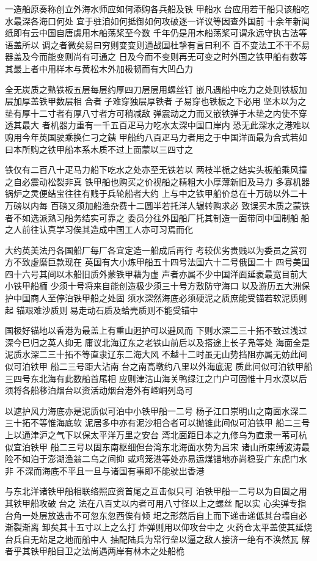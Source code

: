 \documentclass[a4paper,12pt,UTF8,twoside]{ctexbook}
\begin{document}
一造船原奏称创立外海水师应如何添购各兵船及铁
甲船水𪿫台应用若干船只该船吃水最深各海口何处
宜于驻洎如何抵御如何攻破逐一详议等因查外国前
十余年新闻纸即有云中国自唐虞用木船荡桨至今数
千年仍是用木船荡桨可谓永远守执古法等语盖所以
调之者微矣易曰穷则变变则通战国杜挚有言曰利不
百不变法工不干不易器盖及今而能变则尚有可通之
日及今而不变则再无可变之时外国之铁甲船有数等
其最上者中用样木与黄松木外加极韧而有大凹凸力

全无炭质之熟铁板五层每层约厚四刀层层用螺丝钉
嵌凡遇船中吃力之处则铁板加层加厚盖铁甲数层相
合者𪿫子难穿独层厚铁者𪿫子易穿也铁板之下必用
坚木以为之垫有厚十二寸者有厚八寸者方可稍减敌
弹震动之力而又嵌铁弹于木垫之内使不穿透其最大
者机器力重有一千五百疋马力吃水太深中国口岸内
恐无此深水之港难以购用今年英国驶乘换仁刁之銕
甲船约八百疋马力者用之于中国洋面最为合式若如
曰本所购之铁甲船本系木质不过上面蒙以三四寸之

铁仅有二百八十疋马力船下吃水之处亦至无铁若以
两枝半栀之结实头板船乘风撞之自必震动松裂非真
铁甲船也购买之价视船之精粗大小厚薄新旧及马力
多寡机器锅炉之灵便结宝往往有贱于兵轮船者大约
上与中之铁甲船价总在十万磅以外二十万磅以内每
百磅又须加船渔杂费十二圆半若托洋人辗转购求必
致误买木质之蒙铁者不如选派熟习船务结实可靠之
委员分往外国船厂托其制造一面带同中国制船𮩽船
之人前往认真学习俟其造成中国工人亦可习焉而化

大约英美法丹各国船厂每厂各宜定造一船成后再行
考较优劣贵贱以为委员之赏罚方不致虚縻巨款现在
英国有大小炼甲船五十四号法国六十二号俄国二十
四号美国四十六号其间以木船旧质外蒙铁甲藉为虚
声者亦属不少中国洋面延袤最宽目前大小铁甲船栭
少须十号将来自能创造极少须三十号方敷防守海口
以及游历五大洲保护中国商人至停泊铁甲船之处固
须水深然海底必须硬泥之质庶能受锚若软泥质则起
锚艰难沙质则𬮁易走动石质及蛤壳质则不能受锚中

国极好锚地以香港为最盖上有重山迥护可以避风而
下则水深二三十拓不致过浅过深今巳归之英人抑无
庸议北海辽东之老铁山前后以及搭途上长子凫等处
海面全是泥质水深二三十拓不等直隶辽东二海大风
不越十二时虽无山势挡阻亦属无妨此间似可泊铁甲
船二三号距大沾南𪿫台之南高墩约八里以外海底泥
质此间似可泊铁甲船三四号东北海有此数船首尾相
应则津沽山海关鸭绿江之门户可固惟十月水漠以后
须将各船移泊烟台以资活动烟台港外有崆峒列岛可

以遮护风力海底亦是泥质似可泊中小铁甲船一二号
杨子江口崇明山之南面水深二三十拓不等惟海底软
泥居多中亦有泥沙相合者可以抛锥此间似可泊铁甲
船二三号上以通津沪之气下以保太平洋万里之安台
湾北面距日本之九修乌为直隶一苇可杭似宜泊铁甲
船二三号以固东南枢细但台湾东北海面水势为吕宋
诸山所束缚波涛最险不如泊于澎湖渔翁二乌之间抑
或鸡笼港等处亦易运煤锚地亦尚稳妥广东虎门水非
不深而海底不平且一旦与诸国有事即不能驶出香港

与东北洋诸铁甲船相联络照应资首尾之互击似只可
泊铁甲船一二号以为自固之用其铁甲船攻破𪿫台之
法在八百丈以内者可用八寸径以上之螺丝𪿫配以实
心尖弹专指台角一处层放迭击不可忽东忽西俟有倾
圯之形然后自上而下递击递低其台墙自必渐裂渐离
卸矣其十五寸以上之么打𪿫炸弹则用以仰攻台中之
火药仓太平盖使其延烧台兵自无站足之地而船中人
抽配陆兵为常行垒以逼之敌人接济一绝有不涣然瓦
解者乎其铁甲船目卫之法尚遇两岸有林木之处船桅

\backmatter
\end{document}
